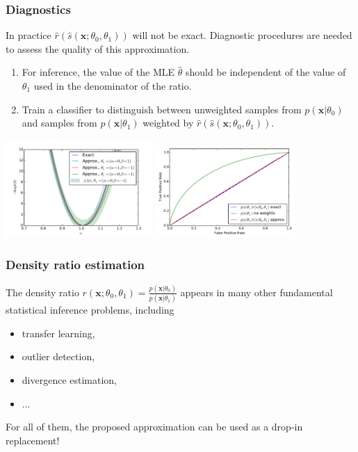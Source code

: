 \documentclass{beamer}
\begin{document}
\begin{frame}
    \frametitle{Diagnostics}

    In practice $\hat{r}(\hat{s}(\mathbf{x}; \theta_0, \theta_1))$ will not be exact.  Diagnostic procedures are needed to assess the quality of this approximation.

    \begin{enumerate}
        \item For inference, the value of the MLE $\hat{\theta}$ should be independent of the value of $\theta_1$ used in the denominator of the ratio.
        \item Train a classifier to distinguish between unweighted samples from $p(\mathbf{x}|\theta_0)$ and samples from $p(\mathbf{x}|\theta_1)$ weighted by $\hat{r}(\hat{s}(\mathbf{x}; \theta_0, \theta_1))$.
    \end{enumerate}

    \vspace{-2em}

    \begin{center}
            \includegraphics[clip, trim=0.3cm 0.3cm 0.3cm 0.3cm,height=10.075em]{figures/likelihood_comp_2.pdf}
            \includegraphics[clip, trim=0.3cm 0.3cm 0.3cm 0.3cm,height=9.5em]{figures/ROC_comp2.pdf}
    \end{center}

\end{frame}

\begin{frame}
    \frametitle{Density ratio estimation}

    The density ratio $r(\mathbf{x} ; \theta_0, \theta_1) = \frac{p(\mathbf{x}|\theta_0)} { p(\mathbf{x}|\theta_1) }$ appears in many other fundamental statistical inference problems, including

    \begin{itemize}
        \item transfer learning,
        \item outlier detection,
        \item divergence estimation,
        \item ...
    \end{itemize}

    {\color{red} For all of them, the proposed approximation can be used as a drop-in replacement!}
\end{frame}
\end{document}

